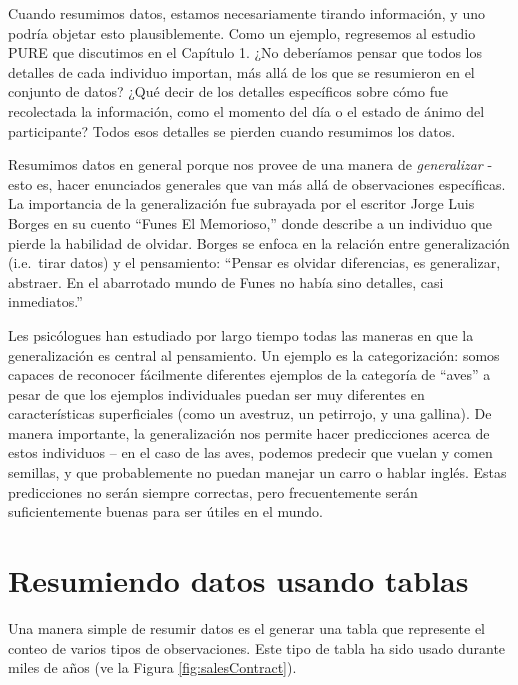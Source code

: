 \documentclass[
  12pt,
]{book}
\theoremstyle{definition}
\theoremstyle{definition}
\theoremstyle{definition}
\theoremstyle{remark}
\begin{document}
Cuando resumimos datos, estamos necesariamente tirando información, y uno podría objetar esto plausiblemente. Como un ejemplo, regresemos al estudio PURE que discutimos en el Capítulo 1. ¿No deberíamos pensar que todos los detalles de cada individuo importan, más allá de los que se resumieron en el conjunto de datos? ¿Qué decir de los detalles específicos sobre cómo fue recolectada la información, como el momento del día o el estado de ánimo del participante? Todos esos detalles se pierden cuando resumimos los datos.

Resumimos datos en general porque nos provee de una manera de \emph{generalizar} - esto es, hacer enunciados generales que van más allá de observaciones específicas. La importancia de la generalización fue subrayada por el escritor Jorge Luis Borges en su cuento ``Funes El Memorioso,'' donde describe a un individuo que pierde la habilidad de olvidar. Borges se enfoca en la relación entre generalización (i.e.~tirar datos) y el pensamiento: ``Pensar es olvidar diferencias, es generalizar, abstraer. En el abarrotado mundo de Funes no había sino detalles, casi inmediatos.''

Les psicólogues han estudiado por largo tiempo todas las maneras en que la generalización es central al pensamiento. Un ejemplo es la categorización: somos capaces de reconocer fácilmente diferentes ejemplos de la categoría de ``aves'' a pesar de que los ejemplos individuales puedan ser muy diferentes en características superficiales (como un avestruz, un petirrojo, y una gallina). De manera importante, la generalización nos permite hacer predicciones acerca de estos individuos -- en el caso de las aves, podemos predecir que vuelan y comen semillas, y que probablemente no puedan manejar un carro o hablar inglés. Estas predicciones no serán siempre correctas, pero frecuentemente serán suficientemente buenas para ser útiles en el mundo.

\hypertarget{resumiendo-datos-usando-tablas}{%
\section{Resumiendo datos usando tablas}\label{resumiendo-datos-usando-tablas}}

Una manera simple de resumir datos es el generar una tabla que represente el conteo de varios tipos de observaciones. Este tipo de tabla ha sido usado durante miles de años (ve la Figura \ref{fig:salesContract}).
\end{document}
